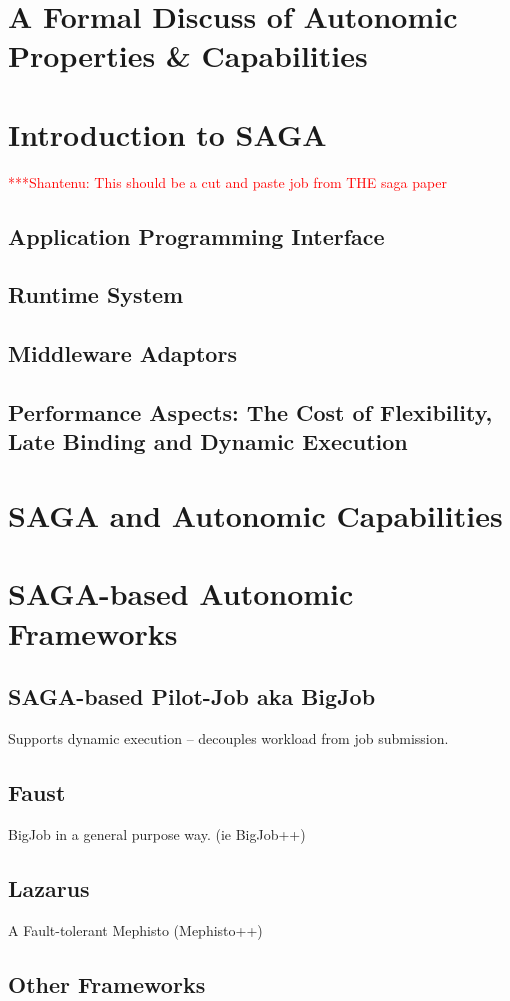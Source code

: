 \documentclass[a4paper,10pt]{article}
\newcommand{\jhanote}[1]{  {\textcolor{red}     { ***Shantenu: #1 }}}
\newcommand{\jhanote}[1]{}
\begin{document}
\section{A Formal Discuss of Autonomic Properties \& Capabilities}

\section{Introduction to SAGA}

\jhanote{This should be a cut and paste job from THE saga paper}

\subsection{Application Programming Interface}

\subsection{Runtime System}

\subsection{Middleware Adaptors}

\subsection{Performance Aspects: The Cost of Flexibility, Late Binding
  and Dynamic Execution}

\section{SAGA and Autonomic Capabilities}


\section{SAGA-based Autonomic Frameworks}

\subsection{SAGA-based Pilot-Job aka BigJob}

Supports dynamic execution -- decouples workload from job submission.

\subsection{Faust}

BigJob in a general purpose way. (ie BigJob++)

\subsection{Lazarus}

A Fault-tolerant Mephisto (Mephisto++)

\subsection{Other Frameworks}


  
 
\end{document}
